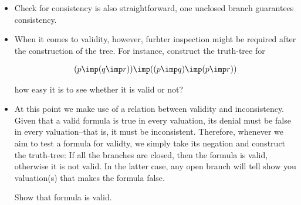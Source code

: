 \documentclass[11pt]{article}
\begin{document}
\begin{itemize}
\begin{uexample}
\begin{align}
\begin{tikzpicture}[level distance=40pt, sibling distance=30pt] 
\tikzset{every tree node/.style={align=center,anchor=north}}
\Tree [.$\cancel{-(p\imp q)\land -p}$ [.$\cancel{-(p\imp q)}$ [.$-p$ [.$p$ $-q$\\$\times$ ] ] ] ]
\end{tikzpicture}
\end{align}

As all the branches are closed, we can conclude that  is
inconsistent. 

\qed
\end{uexample}

\item Check for consistency is also straightforward, one unclosed branch
guarantees consistency.

\item When it comes to validity, however, furhter inspection might be required
after the construction of the tree. For instance, construct the truth-tree for

\begin{align}\label{validex}
(p\imp(q\imp r)) \imp ((p\imp q)\imp(p\imp r))
\end{align}

how easy it is to see whether it is valid or not?

\item At this point we make use of a relation between validity and
inconsistency. Given that a valid formula is true in every valuation, its denial
must be false in every valuation--that is, it must be inconsistent. Therefore,
whenever we aim to test a formula for validty, we simply take its negation and
construct the truth-tree: If all the branches are closed, then the formula is
valid, otherwise it is not valid. In the latter case, any open branch will tell
show you valuation(s) that makes the formula false.

\begin{uexample}
Show that formula  is valid. 


\end{uexample}
\end{itemize}
\end{document}
